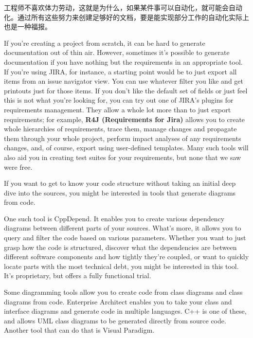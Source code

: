 
工程师不喜欢体力劳动，这就是为什么，如果某件事可以自动化，就可能会自动化。通过所有这些努力来创建足够好的文档，要是能实现部分工作的自动化实际上也是一种福报。


If you're creating a project from scratch, it can be hard to generate documentation out of thin air. However, sometimes it's possible to generate documentation if you have nothing but the requirements in an appropriate tool. If you're using JIRA, for instance, a starting point would be to just export all items from an issue navigator view. You can use whatever filter you like and get printouts just for those items. If you don't like the default set of fields or just feel this is not what you're looking for, you can try out one of JIRA's plugins for requirements management. They allow a whole lot more than to just export requirements; for example, \textbf{R4J (Requirements for Jira)} allows you to create whole hierarchies of requirements, trace them, manage changes and propagate them through your whole project, perform impact analyses of any requirements changes, and, of course, export using user-defined templates. Many such tools will also aid you in creating test suites for your requirements, but none that we saw were free.


If you want to get to know your code structure without taking an initial deep dive into the sources, you might be interested in tools that generate diagrams from code.

One such tool is CppDepend. It enables you to create various dependency diagrams between different parts of your sources. What's more, it allows you to query and filter the code based on various parameters. Whether you want to just grasp how the code is structured, discover what the dependencies are between different software components and how tightly they're coupled, or want to quickly locate parts with the most technical debt, you might be interested in this tool. It's proprietary, but offers a fully functional trial.

Some diagramming tools allow you to create code from class diagrams and class diagrams from code. Enterprise Architect enables you to take your class and interface diagrams and generate code in multiple languages. C++ is one of these, and allows UML class diagrams to be generated directly from source code. Another tool that can do that is Visual Paradigm.

